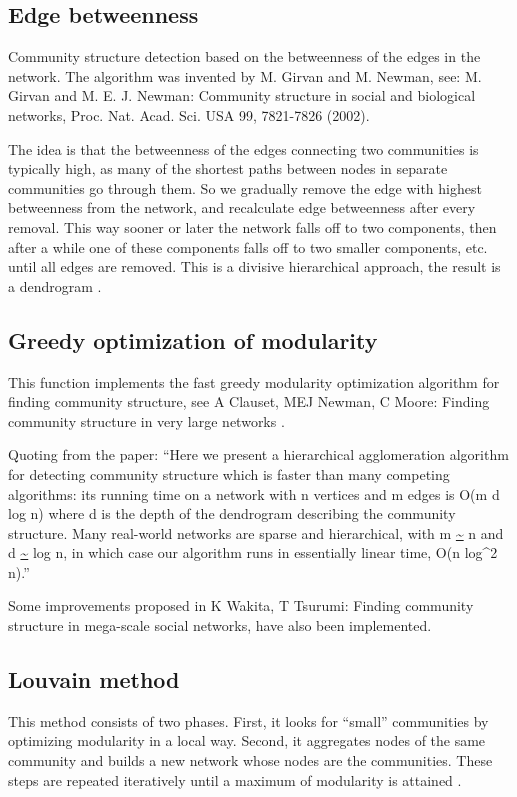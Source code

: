 \documentclass{article}
\begin{document}
  \subsection{Edge betweenness}
    Community structure detection based on the betweenness of the edges in the network. The algorithm was invented by M. Girvan and M. Newman, see: M. Girvan and M. E. J. Newman: Community structure in social and biological networks, Proc. Nat. Acad. Sci. USA 99, 7821-7826 (2002).

    The idea is that the betweenness of the edges connecting two communities is typically high, as many of the shortest paths between nodes in separate communities go through them. So we gradually remove the edge with highest betweenness from the network, and recalculate edge betweenness after every removal. This way sooner or later the network falls off to two components, then after a while one of these components falls off to two smaller components, etc. until all edges are removed. This is a divisive hierarchical approach, the result is a dendrogram \cite{website:edge_betweenness}.

  \subsection{Greedy optimization of modularity}
    This function implements the fast greedy modularity optimization algorithm for finding community structure, see A Clauset, MEJ Newman, C Moore: Finding community structure in very large networks \cite{website:fastgreedy}.

    Quoting from the paper:
    ``Here we present a hierarchical agglomeration algorithm for detecting community structure which is faster than many competing algorithms: its running time on a network with n vertices and m edges is O(m d log n) where d is the depth of the dendrogram describing the community structure. Many real-world networks are sparse and hierarchical, with m \url{~} n and d \url{~} log n, in which case our algorithm runs in essentially linear time, O(n log^2 n).''

    Some improvements proposed in K Wakita, T Tsurumi: Finding community structure in mega-scale social networks, have also been implemented.

  \subsection{Louvain method}
    This method consists of two phases. First, it looks for ``small'' communities by optimizing modularity in a local way. Second, it aggregates nodes of the same community and builds a new network whose nodes are the communities. These steps are repeated iteratively until a maximum of modularity is attained \cite{website:louvain}.
\end{document}

